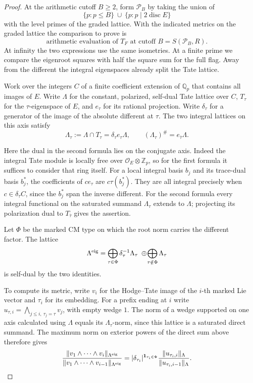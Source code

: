 \begin{proof}
At the arithmetic cutoff \(B\ge2\), form \(\mathcal P_B\) by taking the union of
\[
 \{p:p\le B\}\ \cup\ \{p:p\mid 2\operatorname{disc} E\}
\]
with
the level primes of the graded lattice. With the indicated metrics on the graded lattice the comparison to prove is 
\[
 \text{arithmetic evaluation of }T_F\text{ at cutoff }B=S(\mathcal P_B,R).
\]
At infinity the two expressions use the same isometries. At a
finite prime we compare the eigenroot squares with half the square
sum for the full flag. Away from the different the integral
eigenspaces already split the Tate lattice.

Work over the integers \(C\) of a finite coefficient extension of
\(\mathbb Q_p\) that contains all images of \(E\). Write \(\Lambda\)
for the constant, polarized, self-dual Tate lattice over \(C\),
\(T_\tau\) for the \(\tau\)-eigenspace of \(E\), and \(e_\tau\) for
its rational projection. Write \(\delta_\tau\) for a generator of
the image of the absolute different at \(\tau\). The two integral
lattices on this axis satisfy
\[
   \Lambda_\tau:=\Lambda\cap T_\tau
           =\delta_\tau e_\tau\Lambda,\qquad
   (\Lambda_\tau)^\#=e_{\bar\tau}\Lambda .
\]

Here the dual in the second formula lies on the conjugate axis.
Indeed the integral Tate module is locally free over
\(\mathcal O_E\otimes\mathbb Z_p\), so for the first formula it suffices
to consider that ring itself. For a local integral basis \(b_j\)
and its trace-dual basis \(b_j^*\), the coefficients of \(c e_\tau\)
are \(c\tau(b_j^*)\). They are all integral precisely when
\(c\in\delta_\tau C\), since the \(b_j^*\) span the inverse different.
For the second formula every integral functional on the saturated
summand \(\Lambda_\tau\) extends to \(\Lambda\); projecting its
polarization dual to \(T_{\bar\tau}\) gives the assertion.

Let \(\Phi\) be the marked CM type on which the root norm carries
the different factor. The lattice
\[
 \Lambda^{\rm eig}
  =\bigoplus_{\tau\in\Phi}\delta_\tau^{-1}\Lambda_\tau
      \;\oplus\!\bigoplus_{\tau\notin\Phi}\Lambda_\tau
\]
is self-dual by the two identities.

To compute its metric,
write \(v_i\) for the Hodge--Tate image of the \(i\)-th marked Lie
vector and \(\tau_i\) for its embedding. For a prefix ending at \(i\)
write \(u_{\tau,i}=\bigwedge_{j\le i,\ \tau_j=\tau}v_j\), with empty
wedge \(1\). The norm of a wedge supported on one axis calculated
using \(\Lambda\) equals its \(\Lambda_\tau\)-norm, since this lattice
is a saturated direct summand. The maximum norm on exterior powers
of the direct sum above therefore gives
\[
 \frac{\|v_1\wedge\cdots\wedge v_i\|_{\Lambda^{\rm eig}}}
      {\|v_1\wedge\cdots\wedge v_{i-1}\|_{\Lambda^{\rm eig}}}
 = |\delta_{\tau_i}|^{\mathbf 1_{\tau_i\in\Phi}}
   \frac{\|u_{\tau_i,i}\|_{\Lambda}}
        {\|u_{\tau_i,i-1}\|_{\Lambda}}.
\]


\end{proof}
